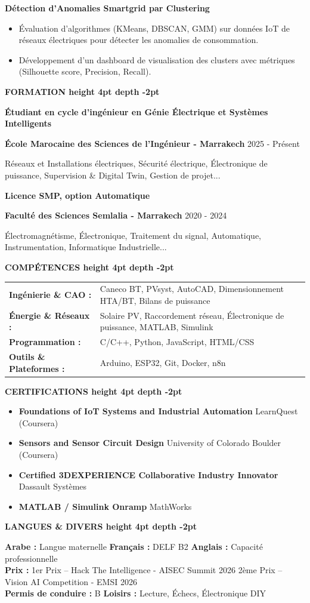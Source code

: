 \documentclass[10pt,a4paper]{../../altacv}
\renewcommand{\cvsection}[2][]{%
  \medskip%
  {\color{heading}\LARGE\bfseries #2 \hspace{0.2em}\leaders\vrule height 4pt depth -2pt\hfill\mbox{}}\par\smallskip
}
\renewcommand{\cvevent}[4]{%
  {\large\bfseries\color{accent}#1\par}
  \smallskip\normalsize
  \ifstrequal{#2}{}{}{%
    \textbf{\color{emphasis}#2\ifstrequal{#4}{}{}{ - #4}}%
  }%
  \hfill
  \ifstrequal{#3}{}{}{{\small#3}}%
  \par\smallskip
}
\begin{document}
{\large\bfseries\color{accent} Détection d'Anomalies Smartgrid par Clustering}\\[0.05cm]
\begin{itemize}
  \item Évaluation d'algorithmes (KMeans, DBSCAN, GMM) sur données IoT de réseaux électriques pour détecter les anomalies de consommation.
  \item Développement d'un dashboard de visualisation des clusters avec métriques (Silhouette score, Precision, Recall).
\end{itemize}

\cvsection{FORMATION}
\cvevent{Étudiant en cycle d'ingénieur en Génie Électrique et Systèmes Intelligents}{École Marocaine des Sciences de l'Ingénieur}{2025 - Présent}{Marrakech}
\small Réseaux et Installations électriques, Sécurité électrique, Électronique de puissance, Supervision \& Digital Twin, Gestion de projet...

\cvevent{Licence SMP, option Automatique}{Faculté des Sciences Semlalia}{2020 - 2024}{Marrakech}
\small Électromagnétisme, Électronique, Traitement du signal, Automatique, Instrumentation, Informatique Industrielle...

\cvsection{COMPÉTENCES}
\begin{tabular}{@{}ll@{}}
\textbf{Ingénierie \& CAO :} & Caneco BT, PVsyst, AutoCAD, Dimensionnement HTA/BT, Bilans de puissance \\[1pt]
\textbf{Énergie \& Réseaux :} & Solaire PV, Raccordement réseau, Électronique de puissance, MATLAB, Simulink \\[1pt]
\textbf{Programmation :} & C/C++, Python, JavaScript, HTML/CSS \\[1pt]
\textbf{Outils \& Plateformes :} & Arduino, ESP32, Git, Docker, n8n \\
\end{tabular}

\cvsection{CERTIFICATIONS}
\begin{itemize}[leftmargin=*, label=\textbullet, itemsep=2pt]
  \item \textbf{Foundations of IoT Systems and Industrial Automation} \hfill {\color{emphasis}LearnQuest (Coursera)}
  \item \textbf{Sensors and Sensor Circuit Design} \hfill {\color{emphasis}University of Colorado Boulder (Coursera)}
  \item \textbf{Certified 3DEXPERIENCE Collaborative Industry Innovator} \hfill {\color{emphasis}Dassault Systèmes}
  \item \textbf{MATLAB / Simulink Onramp} \hfill {\color{emphasis}MathWorks}
\end{itemize}

\cvsection{LANGUES \& DIVERS}
\textbf{Arabe :} Langue maternelle \hfill \textbf{Français :} DELF B2 \hfill \textbf{Anglais :} Capacité professionnelle\\[2pt]
\textbf{Prix :} 1er Prix -- Hack The Intelligence - AISEC Summit 2026 \hfill 2ème Prix -- Vision AI Competition - EMSI 2026\\[2pt]
\textbf{Permis de conduire :} B \hfill \textbf{Loisirs :} Lecture, Échecs, Électronique DIY
\end{document}
